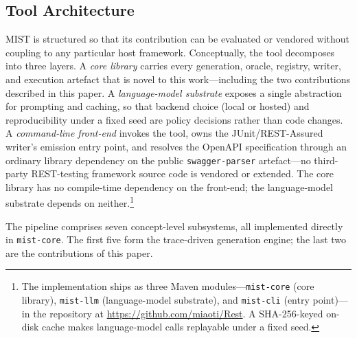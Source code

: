 \documentclass[conference]{IEEEtran}
\begin{document}
\subsection{Tool Architecture}\label{ssec:arch}
\textsc{MIST} is structured so that its contribution can be evaluated or vendored without coupling to any particular host framework. Conceptually, the tool decomposes into three layers. A \emph{core library} carries every generation, oracle, registry, writer, and execution artefact that is novel to this work---including the two contributions described in this paper. A \emph{language-model substrate} exposes a single abstraction for prompting and caching, so that backend choice (local or hosted) and reproducibility under a fixed seed are policy decisions rather than code changes. A \emph{command-line front-end} invokes the tool, owns the JUnit/REST-Assured writer's emission entry point, and resolves the OpenAPI specification through an ordinary library dependency on the public \texttt{swagger-parser} artefact---no third-party REST-testing framework source code is vendored or extended. The core library has no compile-time dependency on the front-end; the language-model substrate depends on neither.\footnote{The implementation ships as three Maven modules---\texttt{mist-core} (core library), \texttt{mist-llm} (language-model substrate), and \texttt{mist-cli} (entry point)---in the repository at \url{https://github.com/miaoti/Rest}. A SHA-256-keyed on-disk cache makes language-model calls replayable under a fixed seed.}

The pipeline comprises seven concept-level subsystems, all implemented directly in \texttt{mist-core}. The first five form the trace-driven generation engine; the last two are the contributions of this paper.
\end{document}
